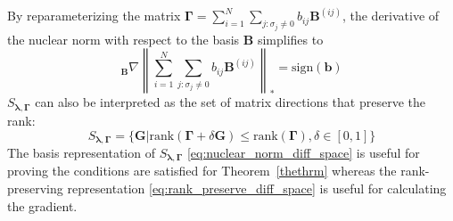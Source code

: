 \documentclass[12pt,letterpaper]{article}
\begin{document}
By reparameterizing the matrix $\boldsymbol{\Gamma} = \sum_{i=1}^N \sum_{j : \sigma_j \ne 0} b_{ij} \boldsymbol{B}^{(ij)}$, the derivative of the nuclear norm with respect to the basis $\boldsymbol{B}$ simplifies to
\begin{equation}
_{\boldsymbol{B}}\nabla 
\left \| \sum_{i=1}^N \sum_{j : \sigma_j \ne 0} b_{ij} \boldsymbol{B}^{(ij)} 
\right \|_{*} = 
\text{sign}(\boldsymbol{b})
\end{equation}
$S_{\boldsymbol{\lambda}, \boldsymbol{\Gamma}}$ can also be interpreted as the set of matrix directions that preserve the rank:
\begin{equation}
S_{\boldsymbol{\lambda}, \boldsymbol{\Gamma}} = \{\boldsymbol{G} | \text{rank}(\boldsymbol{\Gamma} + \delta \boldsymbol{G}) \le \text{rank}(\boldsymbol{\Gamma}), \delta \in [0,1] \}
\label{eq:rank_preserve_diff_space}
\end{equation}
The basis representation of $S_{\boldsymbol{\lambda}, \boldsymbol{\Gamma}}$ \eqref{eq:nuclear_norm_diff_space} is useful for proving the conditions are satisfied for Theorem~\ref{thethrm} whereas the rank-preserving representation \eqref{eq:rank_preserve_diff_space} is useful for calculating the gradient.
\end{document}
